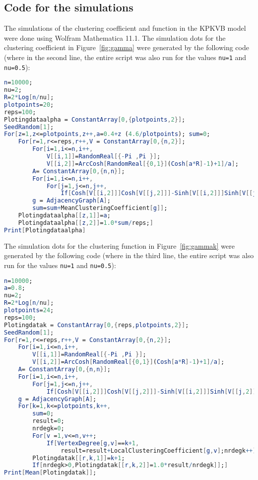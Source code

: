 \begin{appendices}
\section{Code for the simulations}

The simulations of the clustering coefficient and function in the KPKVB model were done using Wolfram Mathematica 11.1.
The simulation dots for the clustering coefficient in Figure~\ref{fig:gamma} were generated by the following code (where in the second line, the entire script was also run for the values \verb|nu=1| and \verb|nu=0.5|):
\begin{lstlisting}[language=Mathematica,breaklines]
n=10000;
nu=2;
R=2*Log[n/nu];
plotpoints=20;
reps=100;
Plotingdataalpha = ConstantArray[0,{plotpoints,2}];
SeedRandom[1];
For[z=1,z<=plotpoints,z++,a=0.4+z (4.6/plotpoints); sum=0;
	For[r=1,r<=reps,r++,V = ConstantArray[0,{n,2}];
		For[i=1,i<=n,i++,
			V[[i,1]]=RandomReal[{-Pi ,Pi }];
			V[[i,2]]=ArcCosh[RandomReal[{0,1}](Cosh[a*R]-1)+1]/a];
		A= ConstantArray[0,{n,n}];
		For[i=1,i<=n,i++,
			For[j=1,j<=n,j++,
				If[Cosh[V[[i,2]]]Cosh[V[[j,2]]]-Sinh[V[[i,2]]]Sinh[V[[j,2]]]Cos[Abs[V[[i,1]]-V[[j,1]]]] <= Cosh[R] && i != j,A[[i,j]]=1,A[[i,j]]=0]]];
		g = AdjacencyGraph[A];
		sum=sum+MeanClusteringCoefficient[g]];
	Plotingdataalpha[[z,1]]=a;
	Plotingdataalpha[[z,2]]=1.0*sum/reps;]
Print[Plotingdataalpha]
\end{lstlisting}
The simulation dots for the clustering function in Figure~\ref{fig:gammak} were generated by the following code (where in the third line, the entire script was also run for the values \verb|nu=1| and \verb|nu=0.5|):
\begin{lstlisting}[language=Mathematica,breaklines]
n=10000;
a=0.8;
nu=2;
R=2*Log[n/nu];
plotpoints=24;
reps=100;
Plotingdatak = ConstantArray[0,{reps,plotpoints,2}];
SeedRandom[1];
For[r=1,r<=reps,r++,V = ConstantArray[0,{n,2}];
	For[i=1,i<=n,i++,
		V[[i,1]]=RandomReal[{-Pi ,Pi }];
		V[[i,2]]=ArcCosh[RandomReal[{0,1}](Cosh[a*R]-1)+1]/a];
	A= ConstantArray[0,{n,n}];
	For[i=1,i<=n,i++,
		For[j=1,j<=n,j++,
			If[Cosh[V[[i,2]]]Cosh[V[[j,2]]]-Sinh[V[[i,2]]]Sinh[V[[j,2]]]Cos[Abs[V[[i,1]]-V[[j,1]]]] <= Cosh[R] && i != j,A[[i,j]]=1,A[[i,j]]=0]]];
	g = AdjacencyGraph[A];
	For[k=1,k<=plotpoints,k++,
		sum=0;
		result=0;
		nrdegk=0;
		For[v =1,v<=n,v++; 
			If[VertexDegree[g,v]==k+1,
				result=result+LocalClusteringCoefficient[g,v];nrdegk++]];
		Plotingdatak[[r,k,1]]=k+1;
		If[nrdegk>0,Plotingdatak[[r,k,2]]=1.0*result/nrdegk]];]
Print[Mean[Plotingdatak]];
\end{lstlisting}

\end{appendices}